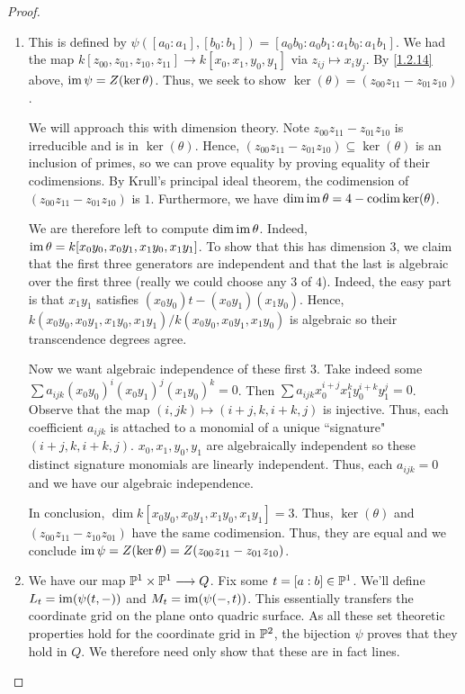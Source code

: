 \begin{proof}
    \begin{enumerate}[label = (\alph*)]
        \item This is defined by $\psi([a_0 : a_1], [b_0 : b_1]) = [a_0 b_0 : a_0 b_1 : a_1 b_0 : a_1 b_1]$. We had the map $k[z_{00}, z_{01}, z_{10}, z_{11}] \longrightarrow k[x_0, x_1, y_0, y_1]$ via $z_{ij} \mapsto x_i y_j$. By \ref{1.2.14} above, $\im \psi = Z(\ker \theta)$. Thus, we seek to show $\ker(\theta) = (z_{00} z_{11} - z_{01} z_{10})$.

        We will approach this with dimension theory. Note $z_{00} z_{11} - z_{01} z_{10}$ is irreducible and is in $\ker(\theta)$. Hence, $(z_{00} z_{11} - z_{01} z_{10}) \subseteq \ker(\theta)$ is an inclusion of primes, so we can prove equality by proving equality of their codimensions. By Krull's principal ideal theorem, the codimension of $(z_{00} z_{11} - z_{01} z_{10})$ is $1$. Furthermore, we have $\dim \im \theta = 4 - \codim \ker(\theta)$.

        We are therefore left to compute $\dim \im \theta$. Indeed, $\im \theta = k[x_0 y_0, x_0 y_1, x_1 y_0, x_1 y_1]$. To show that this has dimension $3$, we claim that the first three generators are independent and that the last is algebraic over the first three (really we could choose any $3$ of $4$). Indeed, the easy part is that $x_1 y_1$ satisfies $(x_0 y_0) t - (x_0 y_1)(x_1 y_0)$. Hence, $k(x_0 y_0, x_0 y_1, x_1 y_0, x_1 y_1) / k(x_0 y_0, x_0 y_1, x_1 y_0)$ is algebraic so their transcendence degrees agree.

        Now we want algebraic independence of these first $3$. Take indeed some $\sum a_{ijk} (x_0 y_0)^i (x_0 y_1)^j (x_1 y_0)^k = 0$. Then $\sum a_{ijk} x_0^{i+j} x_1^{k} y_0^{i + k} y_1^{j} = 0$. Observe that the map $(i, j k) \mapsto (i + j, k, i + k, j)$ is injective. Thus, each coefficient $a_{ijk}$ is attached to a monomial of a unique ``signature" $(i + j, k, i + k, j)$. $x_0, x_1, y_0, y_1$ are algebraically independent so these distinct signature monomials are linearly independent. Thus, each $a_{ijk} = 0$ and we have our algebraic independence.

        In conclusion, $\dim k[x_0 y_0, x_0 y_1, x_1 y_0, x_1 y_1] = 3$. Thus, $\ker(\theta)$ and $(z_{00} z_{11} - z_{10} z_{01})$ have the same codimension. Thus, they are equal and we conclude $\im \psi = Z(\ker \theta) = Z(z_{00} z_{11} - z_{01} z_{10})$.

        \item We have our map $\P^1 \times \P^1 \longrightarrow Q$. Fix some $t = [a : b] \in \P^1$. We'll define $L_t = \im(\psi(t, -))$ and $M_t = \im(\psi(-, t))$. This essentially transfers the coordinate grid on the plane onto quadric surface. As all these set theoretic properties hold for the coordinate grid in $\P^2$, the bijection $\psi$ proves that they hold in $Q$. We therefore need only show that these are in fact lines.


\end{enumerate}
\end{proof}
